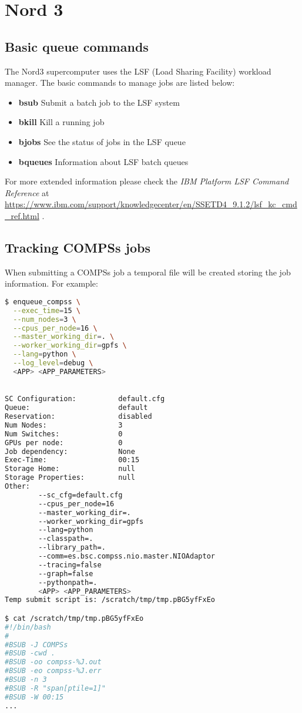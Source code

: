 \section{Nord 3}
\label{sec:nord3}


\subsection{Basic queue commands}

The Nord3 supercomputer uses the LSF (Load Sharing Facility) workload manager. The basic commands to manage jobs are listed below:
\begin{itemize}
 \item \textbf{bsub} Submit a batch job to the LSF system
 \item \textbf{bkill} Kill a running job 
 \item \textbf{bjobs} See the status of jobs in the LSF queue
 \item \textbf{bqueues} Information about LSF batch queues
\end{itemize}

For more extended information please check the \textit{IBM Platform LSF Command Reference} at 
\url{https://www.ibm.com/support/knowledgecenter/en/SSETD4_9.1.2/lsf_kc_cmd_ref.html} .


\subsection{Tracking COMPSs jobs}

When submitting a COMPSs job a temporal file will be created storing the job information. For example:

\begin{lstlisting}[language=bash]
$ enqueue_compss \
  --exec_time=15 \
  --num_nodes=3 \
  --cpus_per_node=16 \
  --master_working_dir=. \
  --worker_working_dir=gpfs \
  --lang=python \
  --log_level=debug \
  <APP> <APP_PARAMETERS>

  
SC Configuration:          default.cfg
Queue:                     default
Reservation:               disabled
Num Nodes:                 3
Num Switches:              0
GPUs per node:             0
Job dependency:            None
Exec-Time:                 00:15
Storage Home:              null
Storage Properties:        null
Other:                     
        --sc_cfg=default.cfg
        --cpus_per_node=16
        --master_working_dir=.
        --worker_working_dir=gpfs
        --lang=python
        --classpath=.
        --library_path=.
        --comm=es.bsc.compss.nio.master.NIOAdaptor
        --tracing=false
        --graph=false
        --pythonpath=.
        <APP> <APP_PARAMETERS>
Temp submit script is: /scratch/tmp/tmp.pBG5yfFxEo

$ cat /scratch/tmp/tmp.pBG5yfFxEo
#!/bin/bash
#
#BSUB -J COMPSs
#BSUB -cwd . 
#BSUB -oo compss-%J.out
#BSUB -eo compss-%J.err
#BSUB -n 3
#BSUB -R "span[ptile=1]"
#BSUB -W 00:15 
...
\end{lstlisting}

